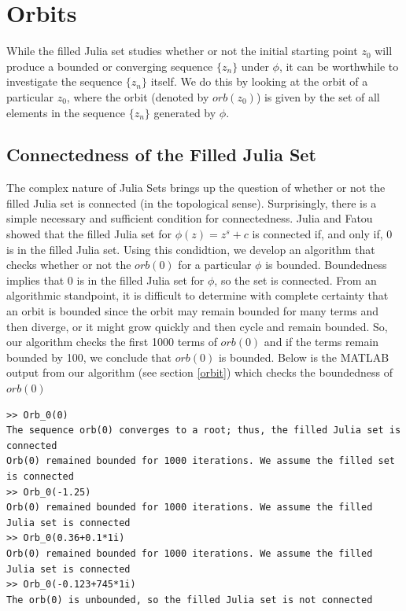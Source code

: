 \documentclass[12pt]{article}
\begin{document}
\section{Orbits}

While the filled Julia set studies whether or not the initial starting point $z_0$ will produce a bounded or converging sequence $\{z_n\}$ under $\phi$, it can be worthwhile to investigate the sequence $\{z_n\}$ itself. We do this by looking at the orbit of a particular $z_0$, where the orbit (denoted by $orb(z_0)$) is given by the set of all elements in the sequence $\{z_n\}$ generated by $\phi$. 
	
\subsection{Connectedness of the Filled Julia Set}
The complex nature of Julia Sets brings up the question of whether or not the filled Julia set is connected (in the topological sense). Surprisingly, there is a simple necessary and sufficient condition for connectedness. Julia and Fatou showed that the filled Julia set for $\phi(z)=z^s+c$ is connected if, and only if, $0$ is in the filled Julia set. Using this condidtion, we develop an algorithm that checks whether or not the $orb(0)$ for a particular $\phi$ is bounded. Boundedness implies that $0$ is in the filled Julia set for $\phi$, so the set is connected. From an algorithmic standpoint, it is difficult to determine with complete certainty that an orbit is bounded since the orbit may remain bounded for many terms and then diverge, or it might grow quickly and then cycle and remain bounded. So, our algorithm checks the first 1000 terms of $orb(0)$ and if the terms remain bounded by 100, we conclude that $orb(0)$ is bounded. Below is the MATLAB output from our algorithm (see section \ref{orbit}) which checks the boundedness of $orb(0)$
\begin{verbatim}
>> Orb_0(0)
The sequence orb(0) converges to a root; thus, the filled Julia set is connected 
Orb(0) remained bounded for 1000 iterations. We assume the filled set is connected 
>> Orb_0(-1.25)
Orb(0) remained bounded for 1000 iterations. We assume the filled Julia set is connected 
>> Orb_0(0.36+0.1*1i)
Orb(0) remained bounded for 1000 iterations. We assume the filled Julia set is connected 
>> Orb_0(-0.123+745*1i)
The orb(0) is unbounded, so the filled Julia set is not connected 
\end{verbatim}
   
\end{document}
